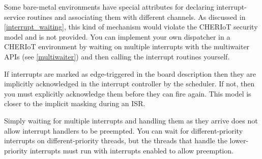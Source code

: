 Some bare-metal environments have special attributes for declaring interrupt-service routines and associating them with different channels.
As discussed in \ref{interrupt_waiting}, this kind of mechanism would violate the CHERIoT security model and is not provided.
You can implement your own dispatcher in a CHERIoT environment by waiting on multiple interrupts with the multiwaiter APIs (see \ref{multiwaiter}) and then calling the interrupt routines yourself.

If interrupts are marked as edge-triggered in the board description then they are implicitly acknowledged in the interrupt controller by the scheduler.
If not, then you must explicitly acknowledge them before they can fire again.
This model is closer to the implicit masking during an ISR.

\begin{caution}
Simply waiting for multiple interrupts and handling them as they arrive does not allow interrupt handlers to be preempted.
You can wait for different-priority interrupts on different-priority threads, but the threads that handle the lower-priority interrupts must run with interrupts enabled to allow preemption.
\end{caution}
